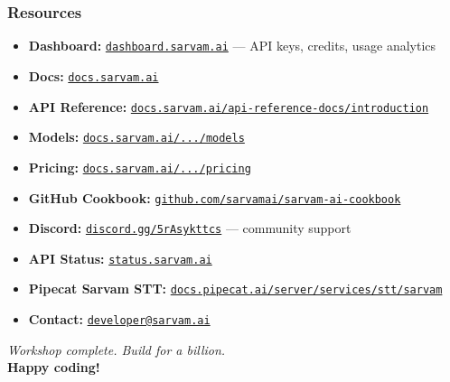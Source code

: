 \begin{frame}[fragile]\frametitle{Resources}
  \begin{itemize}
    \item \textbf{Dashboard:} \href{https://dashboard.sarvam.ai}{\texttt{dashboard.sarvam.ai}} --- API keys, credits, usage analytics
    \item \textbf{Docs:} \href{https://docs.sarvam.ai}{\texttt{docs.sarvam.ai}}
    \item \textbf{API Reference:} \href{https://docs.sarvam.ai/api-reference-docs/introduction}{\texttt{docs.sarvam.ai/api-reference-docs/introduction}}
    \item \textbf{Models:} \href{https://docs.sarvam.ai/api-reference-docs/getting-started/models}{\texttt{docs.sarvam.ai/.../models}}
    \item \textbf{Pricing:} \href{https://docs.sarvam.ai/api-reference-docs/pricing}{\texttt{docs.sarvam.ai/.../pricing}}
    \item \textbf{GitHub Cookbook:} \href{https://github.com/sarvamai/sarvam-ai-cookbook}{\texttt{github.com/sarvamai/sarvam-ai-cookbook}}
    \item \textbf{Discord:} \href{https://discord.com/invite/5rAsykttcs}{\texttt{discord.gg/5rAsykttcs}} --- community support
    \item \textbf{API Status:} \href{https://status.sarvam.ai}{\texttt{status.sarvam.ai}}
    \item \textbf{Pipecat Sarvam STT:} \href{https://docs.pipecat.ai/server/services/stt/sarvam}{\texttt{docs.pipecat.ai/server/services/stt/sarvam}}
    \item \textbf{Contact:} \href{mailto:developer@sarvam.ai}{\texttt{developer@sarvam.ai}}
  \end{itemize}
\begin{center}
\textit{Workshop complete. Build for a billion.}\\[0.5em]
\textbf{Happy coding!}
\end{center}
\end{frame}
